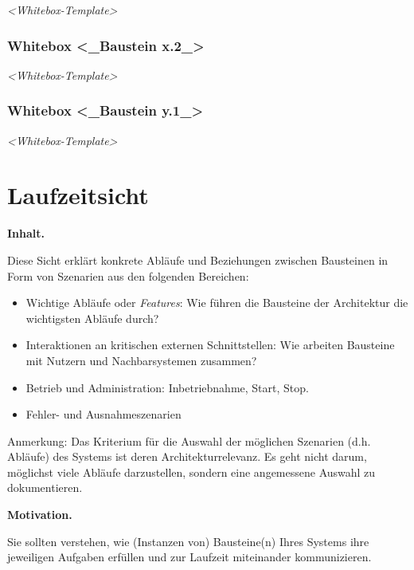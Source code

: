 \documentclass[]{article}
\begin{document}
\emph{\textless{}Whitebox-Template\textgreater{}}

\hypertarget{_whitebox_baustein_x_2}{%
\subsubsection{Whitebox \textless{}\_Baustein
x.2\_\textgreater{}}\label{_whitebox_baustein_x_2}}

\emph{\textless{}Whitebox-Template\textgreater{}}

\hypertarget{_whitebox_baustein_y_1}{%
\subsubsection{Whitebox \textless{}\_Baustein
y.1\_\textgreater{}}\label{_whitebox_baustein_y_1}}

\emph{\textless{}Whitebox-Template\textgreater{}}

\hypertarget{section-runtime-view}{%
\section{Laufzeitsicht}\label{section-runtime-view}}

\textbf{Inhalt.}

Diese Sicht erklärt konkrete Abläufe und Beziehungen zwischen Bausteinen
in Form von Szenarien aus den folgenden Bereichen:

\begin{itemize}
\item
  Wichtige Abläufe oder \emph{Features}: Wie führen die Bausteine der
  Architektur die wichtigsten Abläufe durch?
\item
  Interaktionen an kritischen externen Schnittstellen: Wie arbeiten
  Bausteine mit Nutzern und Nachbarsystemen zusammen?
\item
  Betrieb und Administration: Inbetriebnahme, Start, Stop.
\item
  Fehler- und Ausnahmeszenarien
\end{itemize}

Anmerkung: Das Kriterium für die Auswahl der möglichen Szenarien (d.h.
Abläufe) des Systems ist deren Architekturrelevanz. Es geht nicht darum,
möglichst viele Abläufe darzustellen, sondern eine angemessene Auswahl
zu dokumentieren.

\textbf{Motivation.}

Sie sollten verstehen, wie (Instanzen von) Bausteine(n) Ihres Systems
ihre jeweiligen Aufgaben erfüllen und zur Laufzeit miteinander
kommunizieren.
\end{document}
